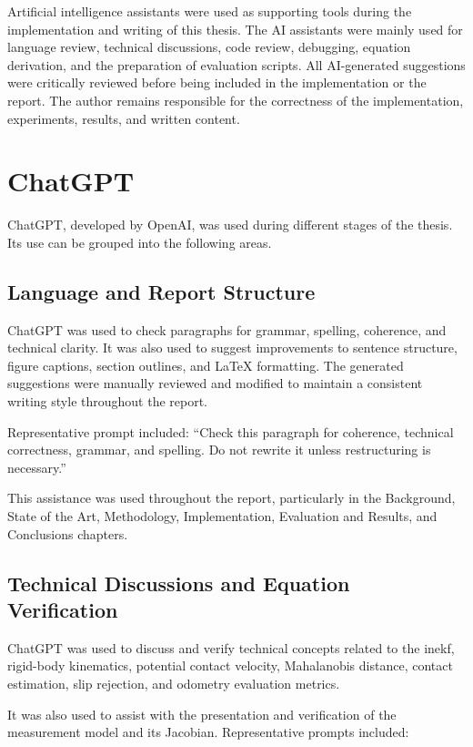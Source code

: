 \documentclass[report.tex]{subfiles}
\begin{document}
Artificial intelligence assistants were used as supporting tools during the implementation and writing of this thesis. The AI assistants were mainly used for language review, technical discussions, code review, debugging, equation derivation, and the preparation of evaluation scripts. All AI-generated suggestions were critically reviewed before being included in the implementation or the report. The author remains responsible for the correctness of the implementation, experiments, results, and written content.

\section{ChatGPT}

ChatGPT, developed by OpenAI, was used during different stages of the thesis. Its use can be grouped into the following areas.

\subsection{Language and Report Structure}

ChatGPT was used to check paragraphs for grammar, spelling, coherence, and technical clarity. It was also used to suggest improvements to sentence structure, figure captions, section outlines, and LaTeX formatting. The generated suggestions were manually reviewed and modified to maintain a consistent writing style throughout the report.

Representative prompt included: ``Check this paragraph for coherence, technical correctness, grammar, and spelling. Do not rewrite it unless restructuring is necessary.''

This assistance was used throughout the report, particularly in the Background, State of the Art, Methodology, Implementation, Evaluation and Results, and Conclusions chapters.

\subsection{Technical Discussions and Equation Verification}

ChatGPT was used to discuss and verify technical concepts related to the \gls{inekf}, rigid-body kinematics, potential contact velocity, Mahalanobis distance, contact estimation, slip rejection, and odometry evaluation metrics.

It was also used to assist with the presentation and verification of the measurement model and its Jacobian. Representative prompts included:
\end{document}
